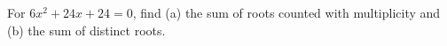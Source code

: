 For $6x^2+24x+24=0$, find (a) the sum of roots counted with multiplicity and (b) the sum of distinct roots.
